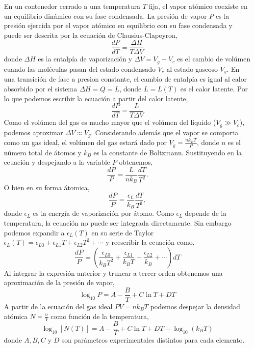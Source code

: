 En un contenedor cerrado a una temperatura $T$ fija, el vapor atómico coexiste en un equilibrio dinámico con su fase condensada. La presión de vapor $P$ es la presión ejercida por el vapor atómico en equilibrio con su fase condensada y puede ser descrita por la ecuación de Clausius-Clapeyron,
\begin{equation}
    \frac{dP}{dT} = \frac{\Delta H}{T \Delta V}
\end{equation}
donde $\Delta H$ es la entalpía de vaporización y $\Delta V = V_g - V_c$ es el cambio de volúmen cuando las moléculas pasan del estado condensado $V_c$ al estado gaseoso $V_g$. En una transición de fase a presion constante, el cambio de entalpía es igual al calor absorbido por el sistema $\Delta H = Q = L$, donde $L = L(T)$ es el calor latente. Por lo que podemos escribir la ecuación a partir del calor latente,
\begin{equation}
    \frac{dP}{dT} = \frac{L}{T \Delta V}
\end{equation}
Como el volúmen del gas es mucho mayor que el volúmen del líquido ($V_g \gg V_c$), podemos aproximar $\Delta V \approx V_g $. Considerando además que el vapor se comporta como un gas ideal, el volúmen del gas estará dado por $V_g = \frac{nk_BT}{P}$, donde $n$ es el número total de átomos y $k_B$ es la constante de Boltzmann. Sustituyendo en la ecuación y despejando a la variable $P$ obtenemos,
\begin{equation}
    \frac{dP}{P} = \frac{L}{n k_B} \frac{dT}{T^2}.
\end{equation}
O bien en su forma átomica,
\begin{equation}
    \frac{dP}{P} = \frac{\epsilon_L}{k_B} \frac{dT}{T^2},
\end{equation}
donde $\epsilon_L$ es la energía de vaporización por átomo. Como $\epsilon_L$ depende de la temperatura, la ecuación no puede ser integrada directamente. Sin embargo podemos expandir a $\epsilon_L(T)$ en su serie de Taylor $\epsilon_L(T) = \epsilon_{L0} + \epsilon_{L1}T + \epsilon_{L2}T^2 + \cdots$ y reescribir la ecuación como,
\begin{equation}
    \frac{dP}{P} = \left( \frac{\epsilon_{L0}}{k_B T^2} + \frac{\epsilon_{L1}}{k_B T} + \frac{\epsilon_{L2}}{k_B} + \cdots \right) dT
\end{equation}  
Al integrar la expresión anterior y truncar a tercer orden obtenemos una aproximación de la presión de vapor,
\begin{equation}
    \log_{10} P = A - \frac{B}{T} + C \ln T + D T
\end{equation}
A partir de la ecuación del gas ideal $PV = n k_B T$ podemos despejar la densidad atómica $N = \frac{n}{V}$ como función de la temperatura,
\begin{equation}
    \boxed{
    \log_{10} [N(T)] = A - \frac{B}{T} + C \ln T + D T - \log_{10} (k_B T)
    }
\end{equation}
donde $A, B, C$ y $D$ son parámetros experimentales distintos para cada elemento.

